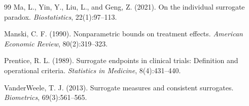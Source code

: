 \documentclass[11pt]{article}
\theoremstyle{definition}
\theoremstyle{plain}
\theoremstyle{remark}
\begin{document}
\begin{thebibliography}{99}
Ma, L., Yin, Y., Liu, L., and Geng, Z. (2021).
\newblock On the individual surrogate paradox.
\newblock \emph{Biostatistics}, 22(1):97--113.

Manski, C. F. (1990).
\newblock Nonparametric bounds on treatment effects.
\newblock \emph{American Economic Review}, 80(2):319--323.

Prentice, R. L. (1989).
\newblock Surrogate endpoints in clinical trials: Definition and operational criteria.
\newblock \emph{Statistics in Medicine}, 8(4):431--440.

VanderWeele, T. J. (2013).
\newblock Surrogate measures and consistent surrogates.
\newblock \emph{Biometrics}, 69(3):561--565.
\end{thebibliography}
\end{document}
